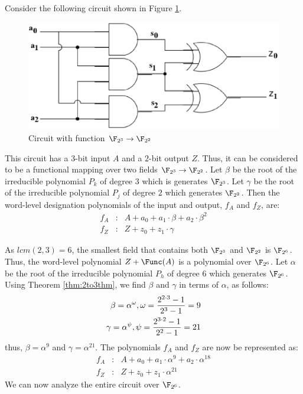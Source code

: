 \begin{Example}
Consider the following circuit shown in Figure \ref{fig:2to3fig}.
\begin{figure}[H]
	\begin{center}
	\includegraphics[scale=0.80]{figures/2to3.eps}
	\end{center}
	\caption{Circuit with function $\F_{2^3} \rightarrow \F_{2^2}$}
	\label{fig:2to3fig}
\end{figure}

This circuit has a $3$-bit input $A$ and a $2$-bit output $Z$. Thus, it can
be considered to be a functional mapping over two fields 
$\F_{2^3} \rightarrow \F_{2^2}$. Let $\beta$ be the root of the irreducible 
polynomial $P_k$ of degree $3$ which is generates $\F_{2^3}$. 
Let $\gamma$ be the root of
the irreducible polynomial $P_j$ of degree $2$
which generates $\F_{2^2}$. Then the 
word-level designation polynomials of the input and output, $f_A$ and $f_Z$, 
are:
\begin{eqnarray}
f_A&:&A+a_0+a_1\cdot\beta+a_2\cdot\beta^2 \nonumber \\
f_Z&:&Z+z_0+z_1\cdot\gamma \nonumber
\end{eqnarray}

As $lcm(2,3)=6$, the smallest field that contains both 
$\F_{2^3}$ and $\F_{2^2}$ is $\F_{2^6}$. Thus,
the word-level polynomial $Z+\Func(A)$ is a polynomial over $\F_{2^6}$.
Let $\alpha$ be the root of the 
irreducible polynomial $P_h$ of degree $6$ which generates $\F_{2^6}$. 
Using Theorem \ref{thm:2to3thm}, we find $\beta$ and $\gamma$ in terms of 
$\alpha$, as follows: 
\begin{eqnarray}
\beta=\alpha^\omega, \omega={2^{2\cdot3}-1 \over 2^3-1}=9 \nonumber \\
\gamma=\alpha^\psi, \psi={2^{3\cdot2}-1 \over 2^2-1}=21 \nonumber
\end{eqnarray}
thus, $\beta=\alpha^9$ and $\gamma=\alpha^{21}$. 
The polynomials $f_A$ and $f_Z$ are now be represented as:
\begin{eqnarray}
f_A&:&A+a_0+a_1\cdot\alpha^9+a_2\cdot\alpha^{18} \nonumber \\
f_Z&:&Z+z_0+z_1\cdot\alpha^{21} \nonumber
\end{eqnarray}
We can now analyze the entire circuit over $\F_{2^6}$.
\label{exp:2to3ex1}
\end{Example}

